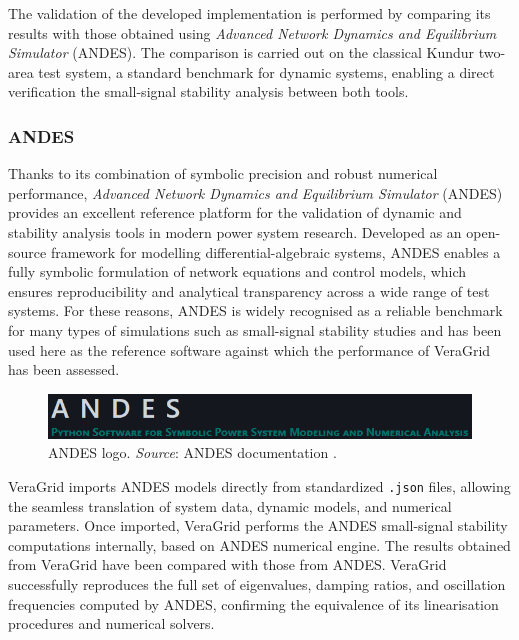 
The validation of the developed implementation is performed by comparing its results with those obtained using 
\textit{Advanced Network Dynamics and Equilibrium Simulator} (ANDES). The comparison is carried out on the classical Kundur two-area test system, 
a standard benchmark for dynamic systems, enabling a direct verification the small-signal stability analysis between both tools.


\subsubsection{ANDES}

Thanks to its combination of symbolic precision and robust numerical performance, \textit{Advanced Network Dynamics and Equilibrium Simulator} (ANDES) 
provides an excellent reference platform for the validation of dynamic and stability analysis tools in modern power system research. 
Developed as an open-source framework for modelling differential-algebraic systems, ANDES enables a fully symbolic formulation of network equations and 
control models, which ensures reproducibility and analytical transparency across a wide range of test systems. 
For these reasons, ANDES is widely recognised as a reliable benchmark for many types of simulations such as small-signal stability studies and has been 
used here as the reference software against which the performance of VeraGrid has been assessed.

\begin{figure}[H]
    \centering
    \includegraphics[width=0.9\linewidth]{figures/ANDES_banner.png}
    \caption{ANDES logo. \textit{Source}: ANDES documentation \cite{andes}.}
\end{figure}

VeraGrid imports ANDES models directly from standardized \texttt{.json} files, allowing the seamless translation of system data, dynamic models, 
and numerical parameters. Once imported, VeraGrid performs the ANDES small-signal stability computations internally, based on ANDES numerical engine. 
The results obtained from VeraGrid have been compared with those from ANDES. VeraGrid successfully reproduces the full set of eigenvalues,
damping ratios, and oscillation frequencies computed by ANDES, confirming the equivalence of its linearisation procedures and numerical solvers. 

